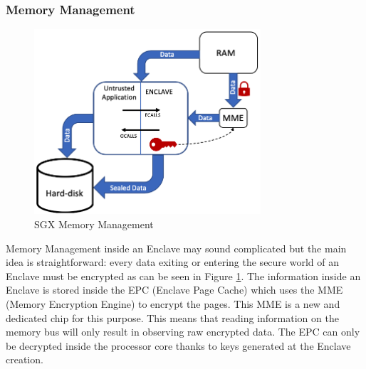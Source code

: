 \documentclass[../main.tex]{subfiles}
\begin{document}
\subsubsection{Memory Management}
\label{section:theoric:memory_management}
\begin{figure}[h]
    \centering
    \includegraphics[width=0.75\textwidth]{images/theoric/memory_sgx}
    
    \caption{SGX Memory Management}
    \label{figure:theoric:memory_sgx}
\end{figure}
\par Memory Management inside an Enclave may sound complicated but the main idea is straightforward: every data exiting or entering the secure world of an Enclave must be encrypted as can be seen in Figure \ref{figure:theoric:memory_sgx}. The information inside an Enclave is stored inside the EPC (Enclave Page Cache) which uses the MME (Memory Encryption Engine) to encrypt the pages. This MME is a new and dedicated chip for this purpose. This means that reading information on the memory bus will only result in observing raw encrypted data. The EPC can only be decrypted inside the processor core thanks to keys generated at the Enclave creation.
\end{document}
